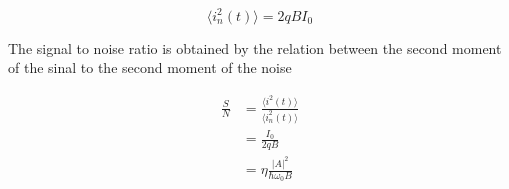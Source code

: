 \begin{bibunit}[plain]
\begin{equation}
	\langle i_n^2(t) \rangle = 2 q B I_0
\end{equation}

The signal to noise ratio is obtained by the relation between the second moment of the sinal to the second moment of the noise

\begin{align}
	\frac{S}{N} &= \frac{\langle i^2(t) \rangle}{\langle i_n^2(t) \rangle} \nonumber\\
                &= \frac{I_0}{2 q B}\nonumber\\
                &= \eta \frac{ |A|^2}{\hbar \omega_0 B}
\end{align}





\end{bibunit}
